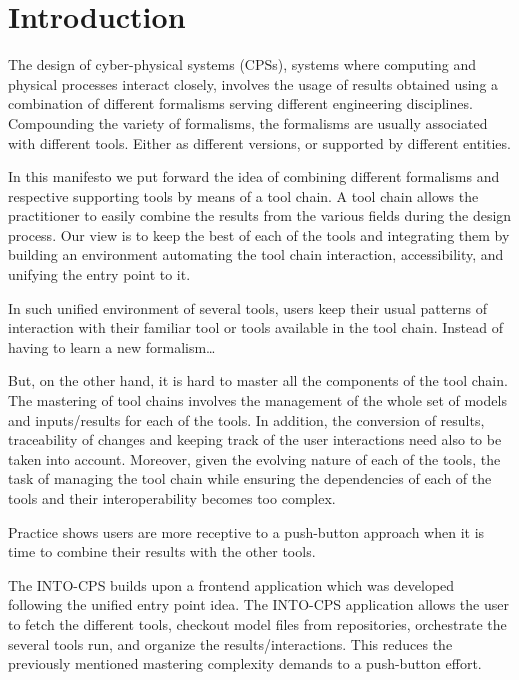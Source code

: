 
\section{Introduction}\label{sec:intro}


The design of cyber-physical systems (CPSs), systems where computing and
physical processes interact closely, involves the usage of results obtained
using a combination of different formalisms serving different engineering
disciplines. Compounding the variety of formalisms, the formalisms are usually
associated with different tools. Either as different versions, or supported by 
different entities.

In this manifesto we put forward the idea of combining different formalisms and
respective supporting tools by means of a tool chain. A tool chain allows the
practitioner to easily combine the results from the various fields during the
design process.  Our view is to keep the best of each of the tools and
integrating them by building an environment automating the tool chain
interaction, accessibility, and unifying the entry point to it. 

In such unified environment of several tools, users keep their usual patterns
of interaction with their familiar tool or tools available in the tool chain.
Instead of having to learn a new formalism\ldots


But, on the other hand, it is hard to master all the components of the tool
chain.  The mastering of tool chains involves the management of the whole set
of models and inputs/results for each of the tools. In addition, the conversion
of results, traceability of changes and keeping track of the user interactions
need also to be taken into account.  Moreover, given the evolving nature of
each of the tools, the task of managing the tool chain while ensuring the
dependencies of each of the tools and their interoperability becomes too
complex. 

Practice shows users are more receptive to a  push-button approach when it is
time to combine their results with the other tools.  

The INTO-CPS builds upon a frontend application which was developed following the
unified entry point idea.  The INTO-CPS application allows the user to fetch
the different tools, checkout model files from repositories, orchestrate the
several tools run, and organize the results/interactions.  This reduces the
previously mentioned mastering complexity demands to a push-button effort.
 


